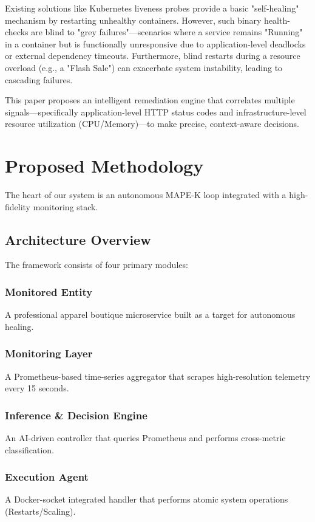 \documentclass[conference]{IEEEtran}
\begin{document}
Existing solutions like Kubernetes liveness probes provide a basic "self-healing" mechanism by restarting unhealthy containers. However, such binary health-checks are blind to "grey failures"---scenarios where a service remains "Running" in a container but is functionally unresponsive due to application-level deadlocks or external dependency timeouts. Furthermore, blind restarts during a resource overload (e.g., a "Flash Sale") can exacerbate system instability, leading to cascading failures.

This paper proposes an intelligent remediation engine that correlates multiple signals---specifically application-level HTTP status codes and infrastructure-level resource utilization (CPU/Memory)---to make precise, context-aware decisions.

\section{Proposed Methodology}
The heart of our system is an autonomous MAPE-K loop integrated with a high-fidelity monitoring stack.

\subsection{Architecture Overview}
The framework consists of four primary modules:
\subsubsection{Monitored Entity} A professional apparel boutique microservice built as a target for autonomous healing.
\subsubsection{Monitoring Layer} A Prometheus-based time-series aggregator that scrapes high-resolution telemetry every 15 seconds.
\subsubsection{Inference & Decision Engine} An AI-driven controller that queries Prometheus and performs cross-metric classification.
\subsubsection{Execution Agent} A Docker-socket integrated handler that performs atomic system operations (Restarts/Scaling).
\end{document}
